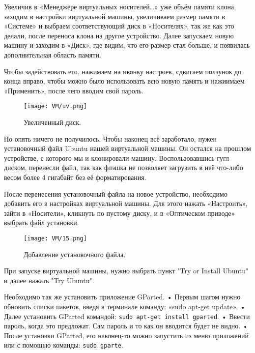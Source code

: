 Увеличив в «Менеджере виртуальных носителей…» уже объём памяти клона, заходим в настройки виртуальной машины, увеличиваем размер памяти в «Системе» и выбраем соответствующий диск в «Носителях», так же как это делали, после переноса клона на другое устройство. Далее запускаем новую машину и заходим в «Диск», где видим, что его размер стал больше, и появилась дополнительная область памяти.

Чтобы задействовать его, нажимаем на иконку настроек, сдвигаем ползунок до конца вправо, чтобы можно было использовать всю новую память и нажиимаем «Применить», после чего вводим свой пароль.

\begin{figure}[h]
		\centering
		\texttt{[image: VM/uv.png]}
\caption{Увеличенный диск.}
\label{ris:image}
\end{figure}

Но опять ничего не получилось. Чтобы наконец всё заработало, нужен установочный файл Ubuntu нашей виртуальной машины. Он остался на прошлом устройстве, с которого мы и клонировали машину. Воспользовавшись гугл диском, перенесли файл, так как флэшка не позволяет загрузить в неё что-либо весом более 4 гигабайт без её форматирования.

После перенесения установочный файла на новое устройство, необходимо добавить его в настройках виртуальной машины. Для этого нажать «Настроить», зайти в «Носители», кликнуть по пустому диску, и в «Оптическом приводе» выбрать файл установки.

\begin{figure}[h]
		\centering
		\texttt{[image: VM/15.png]}
\caption{Добавление установочного файла.}
\label{ris:image}
\end{figure}

При запуске виртуальной машины, нужно выбрать пункт "Try or Install Ubuntu" и далее нажать "Try Ubuntu". 

Необходимо так же установить приложение GParted.
\newline \quad • Первым шагом нужно обновить списки пакетов, введя в терминале команду: «sudo apt-get update». 
\newline \quad • Далее установить GParted командой: \texttt{sudo apt-get install gparted}. 
\newline \quad • Ввести пароль, когда это предложат. Сам пароль и то как он вводится будет не видно.
\newline \quad • После установки GParted, его наконец-то можно запустить из меню приложений или с помощью команды: \texttt{sudo gparte}. 

